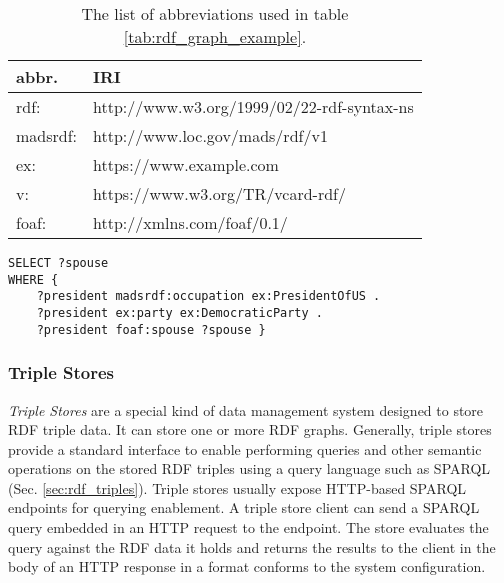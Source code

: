 \begin{table}[h]
	\centering
	\begin{tabular}{ll}
		\textbf{abbr.} & \textbf{IRI}  \\ \hline
		rdf:         &        http://www.w3.org/1999/02/22-rdf-syntax-ns       \\
		madsrdf:          &        	http://www.loc.gov/mads/rdf/v1                 \\
		ex:			&          https://www.example.com            \\
		v:			&          https://www.w3.org/TR/vcard-rdf/          \\
		foaf:			&         http://xmlns.com/foaf/0.1/           \\
	\end{tabular}
	\caption{The list of abbreviations used in table \ref{tab:rdf_graph_example}.}
	\label{tab:rdf_graph_abbr}
\end{table}


\begin{lstlisting}[label={lst:sparqlexample},caption={A SPARQL query that returns the spouse of each US president whose party is the democratic.}]
SELECT ?spouse
WHERE { 
	?president madsrdf:occupation ex:PresidentOfUS .
	?president ex:party ex:DemocraticParty .
	?president foaf:spouse ?spouse }
\end{lstlisting}
 
 \subsubsection{Triple Stores}
 \textit{Triple Stores} are a special kind of data management system designed to store RDF triple data. 
 It can store one or more RDF graphs. 
 Generally, triple stores provide a standard interface to enable performing queries and other semantic operations on the stored RDF triples using a query language such as SPARQL (Sec. \ref{sec:rdf_triples}).
 Triple stores usually expose HTTP-based SPARQL endpoints for querying enablement. 
 A triple store client can send a SPARQL query embedded in an HTTP request to the endpoint.
 The store evaluates the query against the RDF data it holds and returns the results to the client in the body of an HTTP response in a format conforms to the system configuration.
 
\clearpage